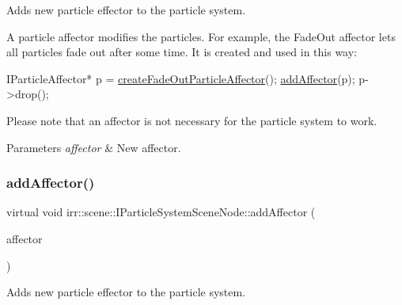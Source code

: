 Adds new particle effector to the particle system. 

A particle affector modifies the particles. For example, the Fade\+Out affector lets all particles fade out after some time. It is created and used in this way\+: 
\begin{DoxyCode}
IParticleAffector* p = \hyperlink{classirr_1_1scene_1_1IParticleSystemSceneNode_a4a9c3ecdf6118267f312f9389bb24888}{createFadeOutParticleAffector}();
\hyperlink{classirr_1_1scene_1_1IParticleSystemSceneNode_a401f5afbbb748878011c5ceb7d447f8b}{addAffector}(p);
p->drop();
\end{DoxyCode}
 Please note that an affector is not necessary for the particle system to work. 
\begin{DoxyParams}{Parameters}
{\em affector} & New affector. \\
\hline
\end{DoxyParams}
\mbox{\label{classirr_1_1scene_1_1IParticleSystemSceneNode_a401f5afbbb748878011c5ceb7d447f8b}} 
\subsubsection{\texorpdfstring{add\+Affector()}{addAffector()}\hspace{0.1cm}{\footnotesize\ttfamily [2/2]}}
{\footnotesize\ttfamily virtual void irr\+::scene\+::\+I\+Particle\+System\+Scene\+Node\+::add\+Affector (\begin{DoxyParamCaption}\item[{\hyperlink{classirr_1_1scene_1_1IParticleAffector}{I\+Particle\+Affector} $\ast$}]{affector }\end{DoxyParamCaption})\hspace{0.3cm}{\ttfamily [pure virtual]}}



Adds new particle effector to the particle system. 

